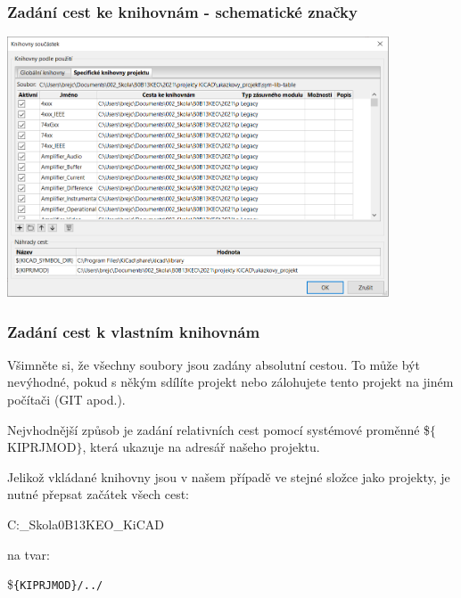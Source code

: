 \documentclass{beamer}
\begin{document}
\begin{frame}
	\frametitle{Zadání cest ke knihovnám - schematické značky}

		\begin{center}
			\includegraphics[width=0.85\textwidth]{obr/knihovny05.png}
		\end{center}
		
\end{frame}
\begin{frame}[fragile]
	\frametitle{Zadání cest k vlastním knihovnám}
	\small
	Všimněte si, že všechny soubory jsou zadány absolutní cestou. To může být nevýhodné, pokud s někým sdílíte projekt nebo zálohujete tento projekt na jiném počítači (GIT apod.).
	
	\vspace{3mm}
	Nejvhodnější způsob je zadání relativních cest pomocí systémové proměnné \$$\{$KIPRJMOD$\}$, která ukazuje na adresář našeho projektu.
	
	\vspace{3mm}
	Jelikož vkládané knihovny jsou v našem případě ve stejné složce jako projekty, je nutné přepsat začátek všech cest:
	
	\begin{verbatim*}
		C:\Users\brejc\Documents{}_Skola\B0B13KEO\projekty_KiCAD\
	\end{verbatim*}
	
	na tvar:
	
	\$\verb+{KIPRJMOD}/../+
		
\end{frame}
\end{document}
